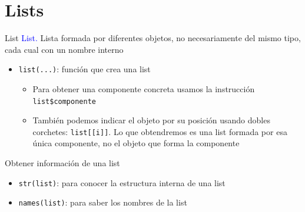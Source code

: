 \documentclass[
  ignorenonframetext,
  aspectratio=169]{beamer}
\providecommand{\tightlist}{%
  \setlength{\itemsep}{0pt}\setlength{\parskip}{0pt}}
\newcommand\blue[1]{\textcolor{blue}{#1}}
\begin{document}
\hypertarget{lists}{%
\section{Lists}\label{lists}}

\begin{frame}[fragile]{List}
\protect\hypertarget{list}{}
\blue{List.} Lista formada por diferentes objetos, no necesariamente del
mismo tipo, cada cual con un nombre interno

\begin{itemize}
\tightlist
\item
  \texttt{list(...)}: función que crea una list

  \begin{itemize}
  \tightlist
  \item
    Para obtener una componente concreta usamos la instrucción
    \texttt{list\$componente}
  \item
    También podemos indicar el objeto por su posición usando dobles
    corchetes: \texttt{list{[}{[}i{]}{]}}. Lo que obtendremos es una
    list formada por esa única componente, no el objeto que forma la
    componente
  \end{itemize}
\end{itemize}
\end{frame}

\begin{frame}[fragile]{Obtener información de una list}
\protect\hypertarget{obtener-informaciuxf3n-de-una-list}{}
\begin{itemize}
\tightlist
\item
  \texttt{str(list)}: para conocer la estructura interna de una list
\item
  \texttt{names(list)}: para saber los nombres de la list
\end{itemize}
\end{frame}
\end{document}
